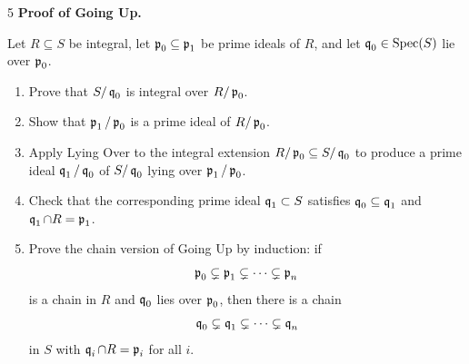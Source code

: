\documentclass[Notebook.tex]{subfiles}
\begin{document}
\begin{problem}{5} \textbf{Proof of Going Up.} 
    
    Let $R\subseteq S$ be integral, let $\fp_0\subseteq \fp_1$ be prime ideals of $R$, and let $\fq_0\in\Spec(S)$ lie over $\fp_0$.
    \begin{enumerate}
        \item Prove that $S/\fq_0$ is integral over $R/\fp_0$.
        \item Show that $\fp_1/\fp_0$ is a prime ideal of $R/\fp_0$.
        \item Apply Lying Over to the integral extension $R/\fp_0\subseteq S/\fq_0$ to produce a prime ideal $\fq_1/\fq_0$ of $S/\fq_0$ lying over $\fp_1/\fp_0$.
        \item Check that the corresponding prime ideal $\fq_1\subset S$ satisfies $\fq_0\subseteq \fq_1$ and $\fq_1\cap R=\fp_1$.
        \item Prove the chain version of Going Up by induction: if
        \[
        \fp_0\subsetneq \fp_1\subsetneq\cdots\subsetneq \fp_n
        \]
        is a chain in $R$ and $\fq_0$ lies over $\fp_0$, then there is a chain
        \[
        \fq_0\subsetneq \fq_1\subsetneq\cdots\subsetneq \fq_n
        \]
        in $S$ with $\fq_i\cap R=\fp_i$ for all $i$. 
    \end{enumerate}
\end{problem}
\end{document}

